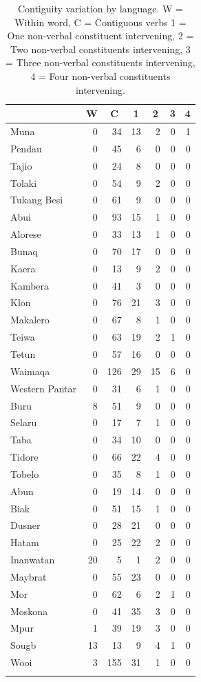 \begin{table}
\begin{tabular}{lrrrrrr}
  \lsptoprule
 & \multicolumn{1}{c}{W} & \multicolumn{1}{c}{C} & \multicolumn{1}{c}{1} & \multicolumn{1}{c}{2} & \multicolumn{1}{c}{3} & \multicolumn{1}{c}{4} \tabularnewline 
  \midrule
  Muna &   0 &  34 &  13 &   2 &   0 &   1 \tabularnewline 
  Pendau &   0 &  45 &   6 &   0 &   0 &   0 \tabularnewline 
  Tajio &   0 &  24 &   8 &   0 &   0 &   0 \tabularnewline 
  Tolaki &   0 &  54 &  9 &   2 &   0 &   0 \tabularnewline 
  Tukang Besi &   0 &  61 &   9 &   0 &   0 &   0 \tabularnewline \midrule
  Abui &   0 &  93 &  15 &   1 &   0 &   0 \tabularnewline 
  Alorese &   0 &  33 &  13 &   1 &   0 &   0 \tabularnewline 
  Bunaq &   0 &  70 &  17 &   0 &   0 &   0 \tabularnewline 
  Kaera &   0 &  13 &  9 &   2 &   0 &   0 \tabularnewline 
  Kambera &   0 &  41 &   3 &   0 &   0 &   0 \tabularnewline 
  Klon &   0 &  76 &  21 &   3 &   0 &   0 \tabularnewline 
  Makalero &   0 &  67 &  8 &   1 &   0 &   0 \tabularnewline 
  Teiwa &   0 &  63 &  19 &   2 &  1 &   0 \tabularnewline 
  Tetun &   0 &  57 &  16 &   0 &   0 &   0 \tabularnewline 
  Waimaqa &   0 & 126 &  29 &  15 &   6 &   0 \tabularnewline 
  Western Pantar &   0 &  31 &   6 &   1 &   0 &   0 \tabularnewline \midrule
  Buru & 8 & 51 & 9 & 0 & 0 & 0 \tabularnewline
  Selaru &   0 &  17 &  7 &  1 &   0 &   0 \tabularnewline 
  Taba &   0 &  34 &  10 &   0 &   0 &   0 \tabularnewline 
  Tidore & 0 & 66 & 22 & 4 & 0 & 0 \tabularnewline
  Tobelo &   0 &  35 &  8 &   1 &   0 &   0 \tabularnewline 
\midrule
  Abun &   0 &  19 &  14 &   0 &   0 &   0 \tabularnewline 
  Biak &   0 &  51 &  15 &   1 &   0 &   0 \tabularnewline 
  Dusner &   0 &  28 &  21 &   0 &   0 &   0 \tabularnewline 
  Hatam &   0 &  25 &  22 &   2 &   0 &   0 \tabularnewline 
  Inanwatan &  20 &  5 &   1 &   2 &   0 &   0 \tabularnewline
  Maybrat &   0 &  55 &  23 &   0 &   0 &   0 \tabularnewline 
  Mor &   0 &  62 &  6 &   2 &   1 &   0 \tabularnewline 
  Moskona &   0 &  41 &  35 &   3 &   0 &   0 \tabularnewline 
  Mpur &   1 &  39 &  19 &   3 &   0 &   0 \tabularnewline 
  Sougb &  13 &   13 &  9 &   4 &   1 &   0 \tabularnewline 
  Wooi &   3 & 155 &  31 &   1 &   0 &   0\tabularnewline 
   \lspbottomrule
\end{tabular}
\caption[Contiguity variation by language]{Contiguity variation by language. W = Within word, C = Contiguous verbs 1 = One non-verbal constituent intervening, 2 = Two non-verbal constituents intervening, 3 = Three non-verbal constituents intervening, 4 = Four non-verbal constituents intervening.}
\label{table:Contiguity_per_lang}
\end{table}

